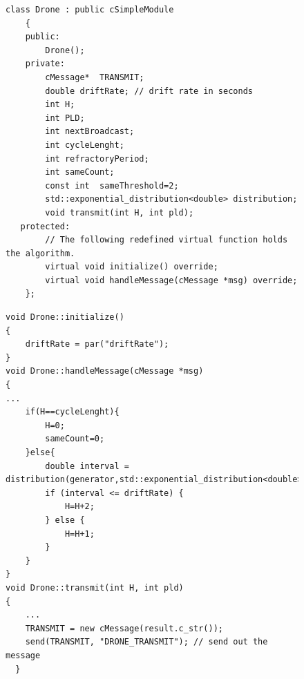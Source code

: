 

\begin{figure}[!htb]            
\begin{minipage}{16.5cm}
\begin{lstlisting}[style=framed,%customc,
	caption=Drone Component Functions,
 	label=omnetusecasedrone]	
    class Drone : public cSimpleModule
    {
    public:
        Drone();
    private:
        cMessage*  TRANSMIT;
        double driftRate; // drift rate in seconds
        int H;
        int PLD;
        int nextBroadcast;
        int cycleLenght;
        int refractoryPeriod;
        int sameCount;
        const int  sameThreshold=2;
        std::exponential_distribution<double> distribution;
        void transmit(int H, int pld);
   protected:
        // The following redefined virtual function holds the algorithm.
        virtual void initialize() override;
        virtual void handleMessage(cMessage *msg) override;
    };
\end{lstlisting}
 \end{minipage}  
\end{figure}

\begin{figure}[!htb]            
\begin{minipage}{16.5cm}
\begin{lstlisting}[style=framed,%customc,
	caption=C/C++ Code Internal Component Structure,
 	label=omnetusecasedronefunction]	
void Drone::initialize()
{
    driftRate = par("driftRate");
}
void Drone::handleMessage(cMessage *msg)
{
...
    if(H==cycleLenght){
        H=0;
        sameCount=0;
    }else{
        double interval = distribution(generator,std::exponential_distribution<double>::param_type(driftRate));
        if (interval <= driftRate) {
            H=H+2;
        } else {
            H=H+1;
        }
    }
}
void Drone::transmit(int H, int pld)
{
    ...
    TRANSMIT = new cMessage(result.c_str());
    send(TRANSMIT, "DRONE_TRANSMIT"); // send out the message
  }
\end{lstlisting}
 \end{minipage}  
\end{figure}

